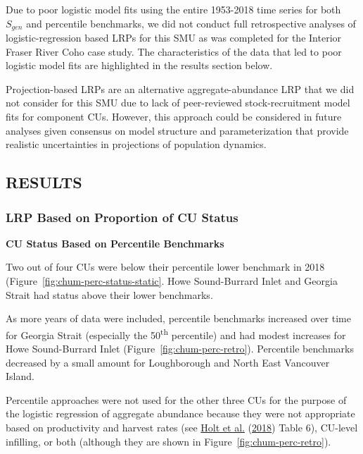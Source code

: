 \documentclass[11pt]{book}
\begin{document}
Due to poor logistic model fits using the entire 1953-2018 time series for both \(S_{gen}\) and percentile benchmarks, we did not conduct full retrospective analyses of logistic-regression based LRPs for this SMU as was completed for the Interior Fraser River Coho case study. The characteristics of the data that led to poor logistic model fits are highlighted in the results section below.

Projection-based LRPs are an alternative aggregate-abundance LRP that we did not consider for this SMU due to lack of peer-reviewed stock-recruitment model fits for component CUs. However, this approach could be considered in future analyses given consensus on model structure and parameterization that provide realistic uncertainties in projections of population dynamics.

\hypertarget{results-3}{%
\subsection{RESULTS}\label{results-3}}

\hypertarget{lrp-based-on-proportion-of-cu-status}{%
\subsubsection{LRP Based on Proportion of CU Status}\label{lrp-based-on-proportion-of-cu-status}}

\textbf{CU Status Based on Percentile Benchmarks}

Two out of four CUs were below their percentile lower benchmark in 2018 (Figure~\ref{fig:chum-perc-status-static}. Howe Sound-Burrard Inlet and Georgia Strait had status above their lower benchmarks.

As more years of data were included, percentile benchmarks increased over time for Georgia Strait (especially the 50\textsuperscript{th} percentile) and had modest increases for Howe Sound-Burrard Inlet (Figure~\ref{fig:chum-perc-retro}). Percentile benchmarks decreased by a small amount for Loughborough and North East Vancouver Island.

Percentile approaches were not used for the other three CUs for the purpose of the logistic regression of aggregate abundance because they were not appropriate based on productivity and harvest rates (see \protect\hyperlink{ref-holtEvaluatingBenchmarksBiological2018}{Holt et al.} (\protect\hyperlink{ref-holtEvaluatingBenchmarksBiological2018}{2018}) Table 6), CU-level infilling, or both (although they are shown in Figure~\ref{fig:chum-perc-retro}).
\end{document}
